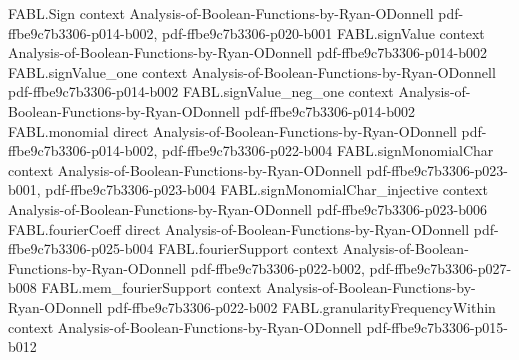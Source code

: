 \begin{theorem}
\label{FABL.biasedFourierCoeff_singleton_eq_sigma_mul_expect_discreteDerivative}
\leanok
{}
\proofstep
  {FABL.Sign}
  {context}
  {Analysis-of-Boolean-Functions-by-Ryan-ODonnell}
  {pdf-ffbe9c7b3306-p014-b002,
    pdf-ffbe9c7b3306-p020-b001}
\proofstep
  {FABL.signValue}
  {context}
  {Analysis-of-Boolean-Functions-by-Ryan-ODonnell}
  {pdf-ffbe9c7b3306-p014-b002}
\proofstep
  {FABL.signValue_one}
  {context}
  {Analysis-of-Boolean-Functions-by-Ryan-ODonnell}
  {pdf-ffbe9c7b3306-p014-b002}
\proofstep
  {FABL.signValue_neg_one}
  {context}
  {Analysis-of-Boolean-Functions-by-Ryan-ODonnell}
  {pdf-ffbe9c7b3306-p014-b002}
\proofstep
  {FABL.monomial}
  {direct}
  {Analysis-of-Boolean-Functions-by-Ryan-ODonnell}
  {pdf-ffbe9c7b3306-p014-b002,
    pdf-ffbe9c7b3306-p022-b004}
\proofstep
  {FABL.signMonomialChar}
  {context}
  {Analysis-of-Boolean-Functions-by-Ryan-ODonnell}
  {pdf-ffbe9c7b3306-p023-b001,
    pdf-ffbe9c7b3306-p023-b004}
\proofstep
  {FABL.signMonomialChar_injective}
  {context}
  {Analysis-of-Boolean-Functions-by-Ryan-ODonnell}
  {pdf-ffbe9c7b3306-p023-b006}
\proofstep
  {FABL.fourierCoeff}
  {direct}
  {Analysis-of-Boolean-Functions-by-Ryan-ODonnell}
  {pdf-ffbe9c7b3306-p025-b004}
\proofstep
  {FABL.fourierSupport}
  {context}
  {Analysis-of-Boolean-Functions-by-Ryan-ODonnell}
  {pdf-ffbe9c7b3306-p022-b002,
    pdf-ffbe9c7b3306-p027-b008}
\proofstep
  {FABL.mem_fourierSupport}
  {context}
  {Analysis-of-Boolean-Functions-by-Ryan-ODonnell}
  {pdf-ffbe9c7b3306-p022-b002}
\proofstep
  {FABL.granularityFrequencyWithin}
  {context}
  {Analysis-of-Boolean-Functions-by-Ryan-ODonnell}
  {pdf-ffbe9c7b3306-p015-b012}

\end{theorem}
